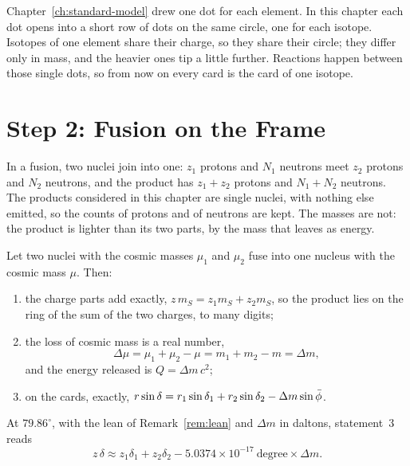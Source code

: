 \begin{plainwords}
Chapter~\ref{ch:standard-model} drew one dot for each element. In this chapter each dot opens into a short row of dots on the same circle, one for each isotope. Isotopes of one element share their charge, so they share their circle; they differ only in mass, and the heavier ones tip a little further. Reactions happen between those single dots, so from now on every card is the card of one isotope.
\end{plainwords}

\section{Step 2: Fusion on the Frame}\label{sec:cl-fusion}

In a fusion, two nuclei join into one: $z_1$ protons and $N_1$ neutrons meet $z_2$ protons and $N_2$ neutrons, and the product has $z_1 + z_2$ protons and $N_1 + N_2$ neutrons. The products considered in this chapter are single nuclei, with nothing else emitted, so the counts of protons and of neutrons are kept. The masses are not: the product is lighter than its two parts, by the mass that leaves as energy.

\begin{proposition}\label{prop:fusion-frame}
Let two nuclei with the cosmic masses $\mu_1$ and $\mu_2$ fuse into one nucleus with the cosmic mass $\mu$. Then:
\begin{enumerate}
  \item the charge parts add exactly, $z\,m_S = z_1 m_S + z_2 m_S$, so the product lies on the ring of the sum of the two charges, to many digits;
  \item the loss of cosmic mass is a real number,
  \[
  \Delta\mu = \mu_1 + \mu_2 - \mu = m_1 + m_2 - m = \Delta m ,
  \]
  and the energy released is $Q = \Delta m\,c^2$;
  \item on the cards, exactly, $r\sin\delta = r_1\sin\delta_1 + r_2\sin\delta_2 - \Delta m\sin\bar{\phi}$.
\end{enumerate}
At $79.86^\circ$, with the lean of Remark~\ref{rem:lean} and $\Delta m$ in daltons, statement~3 reads
\[
z\,\delta \approx z_1\delta_1 + z_2\delta_2 - 5.0374 \times 10^{-17}\ \text{degree} \times \Delta m .
\]
\end{proposition}

